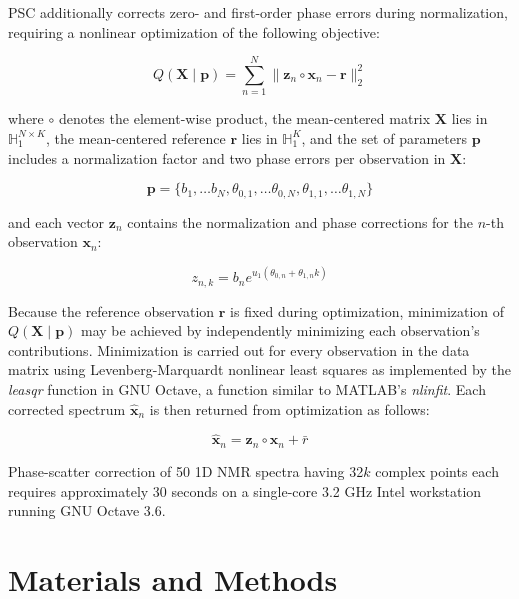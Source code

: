\begin{doublespace}
PSC additionally corrects zero- and first-order phase errors during
normalization, requiring a nonlinear optimization of the following objective:

\begin{equation}
Q(\mathbf{X} \mid \mathbf{p})
 = \sum_{n=1}^N \| \mathbf{z}_n \circ \mathbf{x}_n - \mathbf{r} \|_2^2
\end{equation}

where $\circ$ denotes the element-wise product, the mean-centered matrix
$\mathbf{X}$ lies in $\mathbb{H}_1^{N \times K}$, the mean-centered reference
$\mathbf{r}$ lies in $\mathbb{H}_1^K$, and the set of parameters $\mathbf{p}$
includes a normalization factor and two phase errors per observation
in $\mathbf{X}$:

\begin{equation}
\mathbf{p} = \{
  b_1, \dots b_N,
  \theta_{0,1}, \dots \theta_{0,N},
  \theta_{1,1}, \dots \theta_{1,N} \}
\end{equation}

and each vector $\mathbf{z}_n$ contains the normalization and phase corrections
for the $n$-th observation $\mathbf{x}_n$:

\begin{equation}
z_{n,k} = b_n e^{u_1 (\theta_{0,n} + \theta_{1,n} k)}
\end{equation}

Because the reference observation $\mathbf{r}$ is fixed during optimization,
minimization of $Q(\mathbf{X} \mid \mathbf{p})$ may be achieved by
independently minimizing each observation's contributions. Minimization is
carried out for every observation in the data matrix using Levenberg-Marquardt
nonlinear least squares \cite{marquardt:jsiam1963} as implemented by the
{\it leasqr} function in GNU Octave, a function similar to MATLAB's
{\it nlinfit}. Each corrected spectrum $\hat{\mathbf{x}}_n$ is then returned
from optimization as follows:

\begin{equation}
\hat{\mathbf{x}}_n = \mathbf{z}_n \circ \mathbf{x}_n + \bar{r}
\end{equation}

Phase-scatter correction of 50 1D \hnmr{} NMR spectra having 32$k$ complex
points each requires approximately 30 seconds on a single-core 3.2 GHz Intel
workstation running GNU Octave 3.6.
\end{doublespace}

\section{Materials and Methods}


